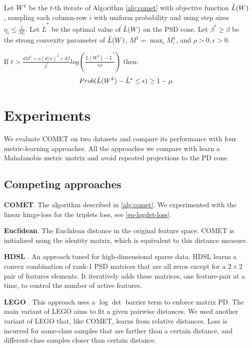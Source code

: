 \documentclass{article}
\begin{document}
\begin{theorem}
Let ${W}^t$ be the $t$-th iterate of Algorithm \ref{alg:comet} with objective function $\tilde{L}({W})$, sampling each column-row $i$ with uniform probability and using step sizes $\eta_i \leq \frac{1}{M_i}$. Let $\tilde{L}^*$ be the optimal value of $\tilde{L}({W})$ on the PSD cone. Let $\beta^* \geq \beta$ be the strong convexity parameter of $\tilde{L}({W})$, $M^1 = \max_i M^1_i$, and $\rho >0, \epsilon>0$.

If $t > \frac{d M^1 + \alpha (d/\kappa)^2 + d\beta}{\beta^*} log \left( \frac{\tilde{L}(W^0) - \tilde{L}^*}{\epsilon \rho}\right)$ then: $$Prob(\tilde{L}({W}^k) - \tilde{L}^* \leq \epsilon) \geq 1-\rho.$$
\end{theorem}


\section{Experiments}
We evaluate COMET on two datasets and compare its performance with four metric-learning approaches. All the approaches we compare with learn a Mahalanobis metric matrix and avoid repeated projections to the PD cone. 


\subsection{Competing approaches}

\textbf{COMET}. The algorithm described in \ref{alg:comet}. We experimented with the linear hinge-loss for the triplets loss, see \eqref{eq-logdet-loss}.

\textbf{Euclidean}. The Euclidean distance in the original feature space. COMET is initialized using the identity matrix, which is equivalent to this distance measure.

\textbf{HDSL} \cite{hdsl}. An approach tuned for high-dimensional sparse data. HDSL learns a convex combination of rank-1 PSD matrices that are all zeros except for a $2\times2$ pair of features elements. It iteratively adds these matrices, one feature-pair at a time, to control the number of active features.

\textbf{LEGO} \cite{lego}. This approach uses a $\log \det$ barrier term to enforce matrix PD. The main variant of LEGO aims to fit a given pairwise distances. We used another variant of LEGO that, like COMET, learns from relative distances. Loss is incurred for same-class samples that are farther than a certain distance, and different-class samples closer than certain distance.
\end{document}
